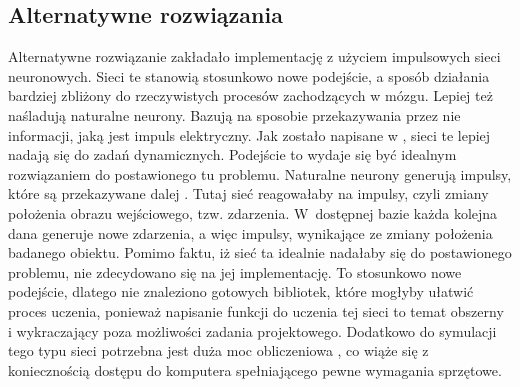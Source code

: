 \subsection{Alternatywne rozwiązania}
\label{sub:alternatywnerozwiazania}

Alternatywne rozwiązanie zakładało implementację z użyciem impulsowych sieci neuronowych. Sieci te stanowią stosunkowo nowe podejście, a sposób działania bardziej zbliżony do rzeczywistych procesów zachodzących w mózgu. Lepiej też naśladują naturalne neurony. Bazują na sposobie przekazywania przez nie informacji, jaką jest impuls elektryczny. Jak zostało napisane w \cite{impuls2}, sieci te lepiej nadają się do zadań dynamicznych.
Podejście to wydaje się być idealnym rozwiązaniem do postawionego tu problemu. Naturalne neurony generują impulsy, które są przekazywane dalej \cite{impuls}. Tutaj sieć reagowałaby na impulsy, czyli zmiany położenia obrazu wejściowego, tzw. zdarzenia. W~dostępnej bazie każda kolejna dana generuje nowe zdarzenia, a więc impulsy, wynikające ze zmiany położenia badanego obiektu. 
Pomimo faktu, iż sieć ta idealnie nadałaby się do postawionego problemu, nie zdecydowano się na jej implementację. To stosunkowo nowe podejście, dlatego nie znaleziono gotowych bibliotek, które mogłyby ułatwić proces uczenia, ponieważ napisanie funkcji do uczenia tej sieci to temat obszerny i wykraczający poza możliwości zadania projektowego. Dodatkowo do symulacji tego typu sieci potrzebna jest duża moc obliczeniowa \cite{impuls2}, co wiąże się z koniecznością dostępu do komputera spełniającego pewne wymagania sprzętowe.